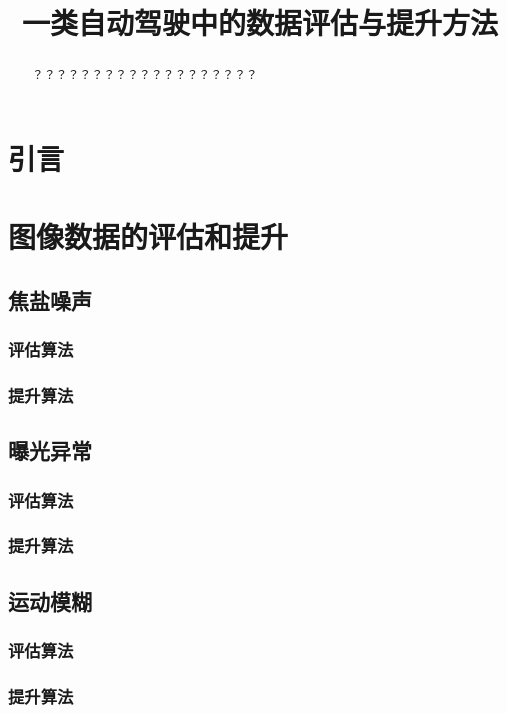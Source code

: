 \documentclass{amsart}
\title{一类自动驾驶中的数据评估与提升方法}
\author{}
\date{}
\begin{document}
\maketitle
\begin{abstract}
  ？？？？？？？？？？？？？？？？？？？
\end{abstract}

\section{引言}

\section{图像数据的评估和提升}
\subsection{焦盐噪声}

\subsubsection{评估算法}
\label{sec:0101}

\subsubsection{提升算法}
\label{sec:0102}



\subsection{曝光异常}
\subsubsection{评估算法}
\label{sec:0101}

\subsubsection{提升算法}
\label{sec:0102}
\subsection{运动模糊}
\subsubsection{评估算法}
\label{sec:0101}

\subsubsection{提升算法}
\label{sec:0102}
\end{document}
